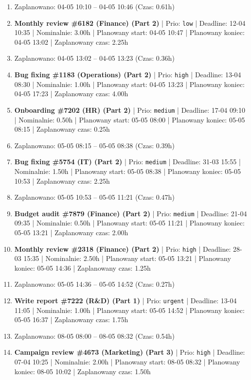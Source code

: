 {\begin{enumerate}
  \item [\textbf{PRZERWA}] Zaplanowano: 04-05 10:10 -- 04-05 10:46 (Czas: 0.61h)
  \item [\textbf{14690}] \textbf{Monthly review \#6182 (Finance) (Part 2)} | Prio: \texttt{low} | Deadline: 12-04 10:35 | Nominalnie: 3.00h | Planowany start: 04-05 10:47 | Planowany koniec: 04-05 13:02 | Zaplanowany czas: 2.25h
  \item [\textbf{PRZERWA}] Zaplanowano: 04-05 13:02 -- 04-05 13:23 (Czas: 0.36h)
  \item [\textbf{14613}] \textbf{Bug fixing \#1183 (Operations) (Part 2)} | Prio: \texttt{high} | Deadline: 13-04 08:30 | Nominalnie: 1.00h | Planowany start: 04-05 13:23 | Planowany koniec: 04-05 17:23 | Zaplanowany czas: 4.00h
  \item [\textbf{14648}] \textbf{Onboarding \#7202 (HR) (Part 2)} | Prio: \texttt{medium} | Deadline: 17-04 09:10 | Nominalnie: 0.50h | Planowany start: 05-05 08:00 | Planowany koniec: 05-05 08:15 | Zaplanowany czas: 0.25h
  \item [\textbf{PRZERWA}] Zaplanowano: 05-05 08:15 -- 05-05 08:38 (Czas: 0.39h)
  \item [\textbf{14631}] \textbf{Bug fixing \#5754 (IT) (Part 2)} | Prio: \texttt{medium} | Deadline: 31-03 15:55 | Nominalnie: 1.50h | Planowany start: 05-05 08:38 | Planowany koniec: 05-05 10:53 | Zaplanowany czas: 2.25h
  \item [\textbf{PRZERWA}] Zaplanowano: 05-05 10:53 -- 05-05 11:21 (Czas: 0.47h)
  \item [\textbf{14644}] \textbf{Budget audit \#7879 (Finance) (Part 2)} | Prio: \texttt{medium} | Deadline: 21-04 09:35 | Nominalnie: 0.50h | Planowany start: 05-05 11:21 | Planowany koniec: 05-05 13:21 | Zaplanowany czas: 2.00h
  \item [\textbf{14618}] \textbf{Monthly review \#2318 (Finance) (Part 2)} | Prio: \texttt{high} | Deadline: 28-03 15:35 | Nominalnie: 2.50h | Planowany start: 05-05 13:21 | Planowany koniec: 05-05 14:36 | Zaplanowany czas: 1.25h
  \item [\textbf{PRZERWA}] Zaplanowano: 05-05 14:36 -- 05-05 14:52 (Czas: 0.27h)
  \item [\textbf{14601}] \textbf{Write report \#7222 (R\&D) (Part 1)} | Prio: \texttt{urgent} | Deadline: 13-04 11:05 | Nominalnie: 1.00h | Planowany start: 05-05 14:52 | Planowany koniec: 05-05 16:37 | Zaplanowany czas: 1.75h
  \item [\textbf{PRZERWA}] Zaplanowano: 08-05 08:00 -- 08-05 08:32 (Czas: 0.54h)
  \item [\textbf{14625}] \textbf{Campaign review \#4673 (Marketing) (Part 3)} | Prio: \texttt{high} | Deadline: 07-04 10:25 | Nominalnie: 2.00h | Planowany start: 08-05 08:32 | Planowany koniec: 08-05 10:02 | Zaplanowany czas: 1.50h

\end{enumerate}}
